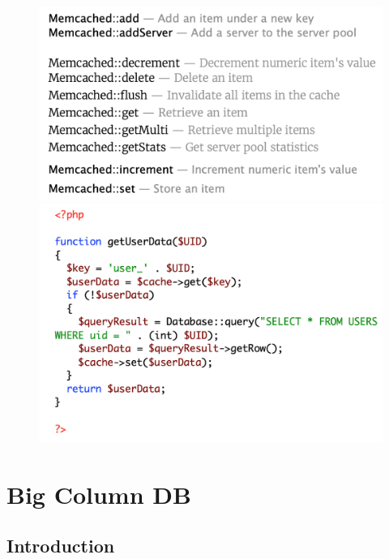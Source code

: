 \documentclass[10pt,a4paper]{article}
\begin{document}
\begin{figure}[h!]
\centering
\begin{minipage}{.5\textwidth}
  \centering
  \includegraphics[width=.8\linewidth]{images/memcached-php}
\end{minipage}%
\begin{minipage}{.5\textwidth}
  \centering
  \includegraphics[width=.8\linewidth]{images/memcached-example}
\end{minipage}
\end{figure}
\pagebreak
\section{Big Column DB}
\subsection{Introduction}
\end{document}
